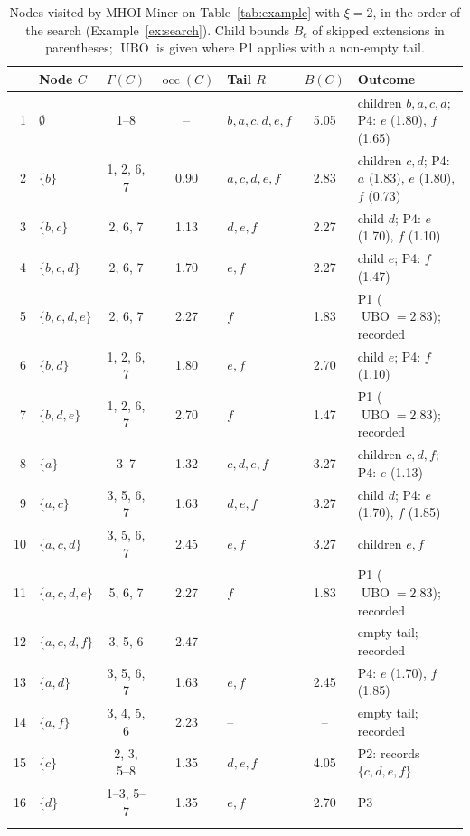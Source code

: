 \documentclass[pdflatex,sn-mathphys,Numbered]{sn-jnl}
\theoremstyle{thmstyleone}
\theoremstyle{thmstyletwo}
\theoremstyle{thmstylethree}
\newcommand{\occ}{\operatorname{occ}}
\newcommand{\ubo}{\operatorname{UBO}}
\newcommand{\Algo}{MHOI-Miner}
\begin{document}
\begin{table}[t]
\caption{Nodes visited by \Algo{} on Table~\ref{tab:example} with $\xi = 2$, in the order of the search (Example~\ref{ex:search}). Child bounds $B_e$ of skipped extensions in parentheses; $\ubo$ is given where P1 applies with a non-empty tail.}\label{tab:trace}
\centering
\scriptsize
\setlength{\tabcolsep}{2.5pt}
\begin{tabular}{@{}rlcclc>{\raggedright\arraybackslash}p{3.7cm}@{}}
\toprule
 & Node $C$ & $\Gamma(C)$ & $\occ(C)$ & Tail $R$ & $B(C)$ & Outcome \\
\midrule
1 & $\emptyset$ & 1--8 & -- & $b, a, c, d, e, f$ & 5.05 & children $b, a, c, d$; P4: $e$ (1.80), $f$ (1.65) \\
2 & $\{b\}$ & 1, 2, 6, 7 & 0.90 & $a, c, d, e, f$ & 2.83 & children $c, d$; P4: $a$ (1.83), $e$ (1.80), $f$ (0.73) \\
3 & $\{b,c\}$ & 2, 6, 7 & 1.13 & $d, e, f$ & 2.27 & child $d$; P4: $e$ (1.70), $f$ (1.10) \\
4 & $\{b,c,d\}$ & 2, 6, 7 & 1.70 & $e, f$ & 2.27 & child $e$; P4: $f$ (1.47) \\
5 & $\{b,c,d,e\}$ & 2, 6, 7 & 2.27 & $f$ & 1.83 & P1 ($\ubo = 2.83$); recorded \\
6 & $\{b,d\}$ & 1, 2, 6, 7 & 1.80 & $e, f$ & 2.70 & child $e$; P4: $f$ (1.10) \\
7 & $\{b,d,e\}$ & 1, 2, 6, 7 & 2.70 & $f$ & 1.47 & P1 ($\ubo = 2.83$); recorded \\
8 & $\{a\}$ & 3--7 & 1.32 & $c, d, e, f$ & 3.27 & children $c, d, f$; P4: $e$ (1.13) \\
9 & $\{a,c\}$ & 3, 5, 6, 7 & 1.63 & $d, e, f$ & 3.27 & child $d$; P4: $e$ (1.70), $f$ (1.85) \\
10 & $\{a,c,d\}$ & 3, 5, 6, 7 & 2.45 & $e, f$ & 3.27 & children $e, f$ \\
11 & $\{a,c,d,e\}$ & 5, 6, 7 & 2.27 & $f$ & 1.83 & P1 ($\ubo = 2.83$); recorded \\
12 & $\{a,c,d,f\}$ & 3, 5, 6 & 2.47 & -- & -- & empty tail; recorded \\
13 & $\{a,d\}$ & 3, 5, 6, 7 & 1.63 & $e, f$ & 2.45 & P4: $e$ (1.70), $f$ (1.85) \\
14 & $\{a,f\}$ & 3, 4, 5, 6 & 2.23 & -- & -- & empty tail; recorded \\
15 & $\{c\}$ & 2, 3, 5--8 & 1.35 & $d, e, f$ & 4.05 & P2: records $\{c,d,e,f\}$ \\
16 & $\{d\}$ & 1--3, 5--7 & 1.35 & $e, f$ & 2.70 & P3 \\
\botrule
\end{tabular}
\end{table}
\end{document}
